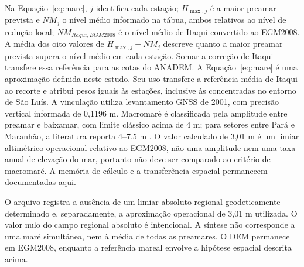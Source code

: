 \documentclass[12pt,a4paper]{article}
\begin{document}
Na Equação~\ref{eq:mare}, $j$ identifica cada estação; $H_{\max,j}$ é a maior preamar prevista e $NM_j$ o nível médio informado na tábua, ambos relativos ao nível de redução local; $NM_{Itaqui,EGM2008}$ é o nível médio de Itaqui convertido ao EGM2008. A média dos oito valores de $H_{\max,j}-NM_j$ descreve quanto a maior preamar prevista supera o nível médio em cada estação. Somar a correção de Itaqui transfere essa referência para as cotas do ANADEM. A Equação~\ref{eq:mare} é uma aproximação definida neste estudo. Seu uso transfere a referência média de Itaqui ao recorte e atribui pesos iguais às estações, inclusive às concentradas no entorno de São Luís. A vinculação utiliza levantamento GNSS de 2001, com precisão vertical informada de 0,1196 m. Macromaré é classificada pela amplitude entre preamar e baixamar, com limite clássico acima de 4 m; para setores entre Pará e Maranhão, a literatura reporta 4--7,5 m \citep{davies1964,souzafilho2005}. O valor calculado de 3,01 m é um limiar altimétrico operacional relativo ao EGM2008, não uma amplitude nem uma taxa anual de elevação do mar, portanto não deve ser comparado ao critério de macromaré. A memória de cálculo e a transferência espacial permanecem documentadas aqui.


O arquivo  registra a ausência de um limiar absoluto regional geodeticamente determinado e, separadamente, a aproximação operacional de 3,01 m utilizada. O valor nulo do campo regional absoluto é intencional. A síntese não corresponde a uma maré simultânea, nem à média de todas as preamares. O DEM permanece em EGM2008, enquanto a referência mareal envolve a hipótese espacial descrita acima.
\end{document}
